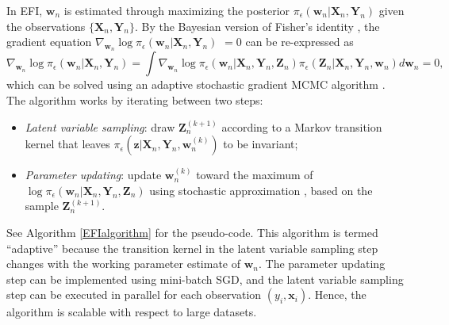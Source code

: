 \documentclass[11pt]{article}
\newcommand{\bX}{{\boldsymbol X}}
\newcommand{\bY}{{\boldsymbol Y}}
\newcommand{\bx}{{\boldsymbol x}}
\newcommand{\bz}{{\boldsymbol z}}
\newcommand{\bt}{{\boldsymbol t}}
\newcommand{\bZ}{{\boldsymbol Z}}
\newcommand{\bw}{{\boldsymbol w}}
\begin{document}

 
 In EFI, $\bw_n$ is estimated through maximizing the posterior 
 $\pi_{\epsilon}(\bw_n|\bX_n,\bY_n)$ given the observations $\{\bX_n,\bY_n \}$.
  By the Bayesian version of Fisher's identity \citep{SongLiang2020eSGLD}, 
 the gradient equation $\nabla_{\bw_n} \log \pi_{\epsilon}(\bw_n|\bX_n,\bY_n)$ $=0$ can be re-expressed as
 \begin{equation} \label{identityeq}
\nabla_{\bw_n} \log \pi_{\epsilon}(\bw_n|\bX_n,\bY_n)=\int  \nabla_{\bw_n} \log \pi_{\epsilon}(\bw_n|\bX_n,\bY_n,\bZ_n) \pi_{\epsilon}(\bZ_n|\bX_n,\bY_n,\bw_n) d\bw_n=0,
\end{equation} 
which can be solved using  an adaptive stochastic gradient MCMC algorithm 
\citep{LiangSLiang2022,deng2019adaptive}. 
The algorithm 
works by iterating between  two steps: 
\begin{itemize} 
\item[(a)] {\it Latent variable sampling}: draw $\bZ_n^{(k+1)}$ according to a Markov transition kernel that leaves $\pi_{\epsilon}(\bz|\bX_n,\bY_n,\bw_n^{(k)})$ to be invariant; 

\item[(b)] {\it Parameter updating}:  update $\bw_n^{(k)}$ toward the maximum of $\log \pi_{\epsilon}(\bw_n|\bX_n,\bY_n,\bZ_n)$ using stochastic approximation \citep{RobbinsM1951}, based on the sample $\bZ_n^{(k+1)}$.
\end{itemize}
See Algorithm \ref{EFIalgorithm} for the pseudo-code.  
 This algorithm is termed ``adaptive'' because the transition kernel in the latent variable sampling step changes with the working parameter estimate of  
 $\bw_n$. The parameter updating step can be implemented using mini-batch SGD, and the latent variable sampling step can be executed in parallel for each observation $(y_i,\bx_i)$. Hence, the algorithm is scalable with respect to  large datasets.
\end{document}
